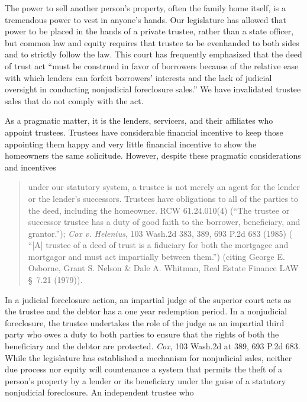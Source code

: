 The power to sell another person's property, often the family home
itself, is a tremendous power to vest in anyone's hands. Our legislature has
allowed that power to be placed in the hands of a private trustee, rather than
a state officer, but common law and equity requires that trustee to be
evenhanded to both sides and to strictly follow the law. This court has
frequently emphasized that the deed of trust act ``must be construed in favor
of borrowers because of the relative ease with which lenders can forfeit
borrowers' interests and the lack of judicial oversight in conducting
nonjudicial foreclosure sales.'' We have invalidated trustee sales that do not
comply with the act.

As a pragmatic matter, it is the lenders, servicers, and their
affiliates who appoint trustees. Trustees have considerable financial incentive
to keep those appointing them happy and very little financial incentive to show
the homeowners the same solicitude. However, despite these pragmatic
considerations and incentives
\begin{quote}
under our statutory system, a trustee is not merely an agent for the lender or
the lender's successors. Trustees have obligations to all of the parties to the
deed, including the homeowner. RCW 61.24.010(4) (``The trustee or successor
trustee has a duty of good faith to the borrower, beneficiary, and grantor.'');
\emph{Cox v. Helenius}, 103 Wash.2d 383, 389, 693 P.2d 683 (1985) ( ``[A]
trustee of a deed of trust is a fiduciary for both the mortgagee and mortgagor
and must act impartially between them.'') (citing George E. Osborne, Grant S.
Nelson \& Dale A. Whitman, Real Estate Finance LAW \S~7.21 (1979)).
\end{quote}
In a judicial foreclosure action, an impartial judge of the superior court acts
as the trustee and the debtor has a one year redemption period. In a
nonjudicial foreclosure, the trustee undertakes the role of the judge as an
impartial third party who owes a duty to both parties to ensure that the rights
of both the beneficiary and the debtor are protected. \emph{Cox}, 103 Wash.2d at
389, 693 P.2d 683. While the legislature has established a mechanism for
nonjudicial sales, neither due process nor equity will countenance a system that
permits the theft of a person's property by a lender or its beneficiary under
the guise of a statutory nonjudicial foreclosure.  An independent trustee who
